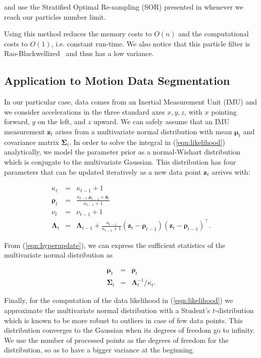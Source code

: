 and use the Stratified Optimal Re-sampling (SOR) presented in
\cite{fearnhead07online} whenever we reach our particles number limit.

Using this method reduces the memory costs to $O(n)$ and the computational costs
to $O(1)$, i.e. constant run-time. We also notice that this particle filter is
Rao-Blackwellized~\cite{casella96rao} and thus has a low variance.

\subsection{Application to Motion Data Segmentation}
In our particular case, data comes from an Inertial Measurement Unit
(IMU) and we consider accelerations in the three standard axes
$x,y,z$, with $x$ pointing forward, $y$ on the left, and $z$ upward.
We can safely assume that an IMU measurement $\mathbf{z}_t$ arises
from a multivariate normal distribution with mean $\boldsymbol{\mu}_t$
and covariance matrix $\boldsymbol{\Sigma}_t$.  In order to solve the
integral in (\ref{eqn:likelihood}) analytically, we model the
parameter prior as a normal-Wishart distribution which is conjugate to
the multivariate Gaussian.  This distribution has four parameters that
can be updated iteratively as a new data point $\mathbf{z}_t$ arrives
with:

\begin{eqnarray}
\label{eqn:hyperupdate}
\kappa_t &=& \kappa_{t-1} + 1\nonumber\\
  \boldsymbol{\rho}_t &=& \frac{\kappa_{t-1}\;\boldsymbol{\rho}_{t-1} +
\mathbf{z}_t}{\kappa_{t-1} + 1}\nonumber\\
\nu_t &=& \nu_{t-1} + 1\nonumber\\
\boldsymbol{\Lambda}_t &=& \boldsymbol{\Lambda}_{t-1} +
  \frac{\kappa_{t-1}}{\kappa_{t-1} + 1}
  (\mathbf{z}_t - \boldsymbol{\rho}_{t-1})
  (\mathbf{z}_t - \boldsymbol{\rho}_{t-1})^\intercal.
\end{eqnarray}

From (\ref{eqn:hyperupdate}), we can express the sufficient statistics of the
multivariate normal distribution as

\begin{eqnarray}
\label{eqn:ssmvn}
\boldsymbol{\mu}_t &=& \boldsymbol{\rho}_t\nonumber\\
\boldsymbol{\Sigma}_t &=& \boldsymbol{\Lambda}_t^{-1} / \kappa_t.
\end{eqnarray}

Finally, for the computation of the data likelihood in
(\ref{eqn:likelihood}) we approximate the multivariate normal
distribution with a Student's $t$-distribution which is known to be
more robust to outliers in case of few data points. This distribution
converges to the Gaussian when its degrees of freedom go to infinity.
We use the number of processed points as the degrees of freedom for
the distribution, so as to have a bigger variance at the beginning.
